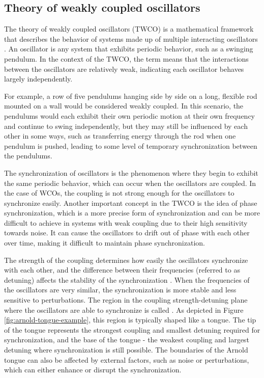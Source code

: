 \subsection{Theory of weakly coupled oscillators}
\label{sec:twco}

The theory of weakly coupled oscillators (TWCO) is a mathematical framework that describes the behavior of systems made up of multiple interacting oscillators \cite{SchultheissBook2011:1}. An oscillator is any system that exhibits periodic behavior, such as a swinging pendulum. In the context of the TWCO, the term  means that the interactions between the oscillators are relatively weak, indicating each oscillator behaves largely independently.

For example, a row of five pendulums hanging side by side on a long, flexible rod mounted on a wall would be considered weakly coupled. In this scenario, the pendulums would each exhibit their own periodic motion at their own frequency and continue to swing independently, but they may still be influenced by each other in some ways, such as transferring energy through the rod when one pendulum is pushed, leading to some level of temporary synchronization between the pendulums.

The synchronization of oscillators is the phenomenon where they begin to exhibit the same periodic behavior, which can occur when the oscillators are coupled. In the case of WCOs, the coupling is not strong enough for the oscillators to synchronize easily. Another important concept in the TWCO is the idea of phase synchronization, which is a more precise form of synchronization and can be more difficult to achieve in systems with weak coupling due to their high sensitivity towards noise. It can cause the oscillators to drift out of phase with each other over time, making it difficult to maintain phase synchronization.

The strength of the coupling determines how easily the oscillators synchronize with each other, and the difference between their frequencies (referred to as detuning) affects the stability of the synchronization \cite{Pikovsky2002, Tiesinga2010, Lowet2015}. When the frequencies of the oscillators are very similar, the synchronization is more stable and less sensitive to perturbations. The region in the coupling strength-detuning plane where the oscillators are able to synchronize is called . As depicted in Figure \ref{fig:arnold-tongue-example}, this region is typically shaped like a tongue. The tip of the tongue represents the strongest coupling and smallest detuning required for synchronization, and the base of the tongue - the weakest coupling and largest detuning where synchronization is still possible. The boundaries of the Arnold tongue can also be affected by external factors, such as noise or perturbations, which can either enhance or disrupt the synchronization.

